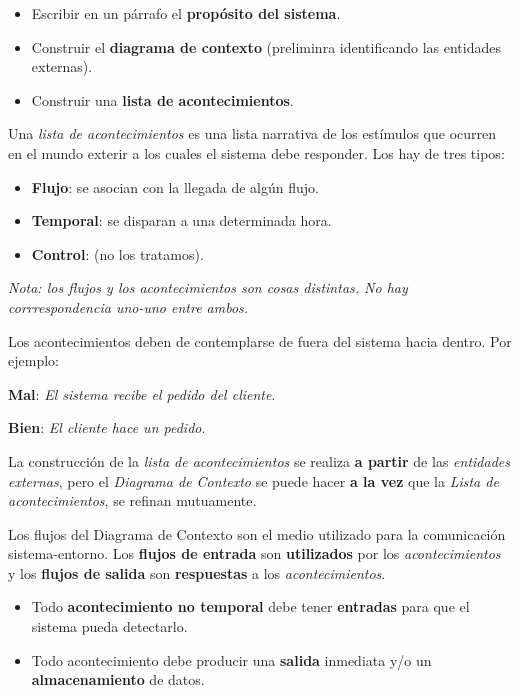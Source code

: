 \begin{itemize}[noitemsep]
\item Escribir en un párrafo el \textbf{propósito del sistema}.
\item Construir el \textbf{diagrama de contexto} (preliminra identificando las entidades externas).
\item Construir una \textbf{lista de acontecimientos}.
\end{itemize}

Una \textit{lista de acontecimientos} es una lista narrativa de los estímulos que ocurren en el mundo exterir a los cuales el sistema debe responder. Los hay de tres tipos:

\begin{itemize}[noitemsep]
\item \textbf{Flujo}: se asocian con la llegada de algún flujo.
\item \textbf{Temporal}: se disparan a una determinada hora.
\item \textbf{Control}: (no los tratamos).
\end{itemize}

\textit{Nota: los flujos y los acontecimientos son cosas distintas. No hay corrrespondencia uno-uno entre ambos.}

Los acontecimientos deben de contemplarse de fuera del sistema hacia dentro. Por ejemplo:

\textbf{Mal}: \textit{El sistema recibe el pedido del cliente}.

\textbf{Bien}: \textit{El cliente hace un pedido}.

La construcción de la \textit{lista de acontecimientos} se realiza \textbf{a partir} de las \textit{entidades externas}, pero el \textit{Diagrama de Contexto} se puede hacer \textbf{a la vez} que la \textit{Lista de acontecimientos}, se refinan mutuamente.

Los flujos del Diagrama de Contexto son el medio utilizado para la comunicación sistema-entorno. Los \textbf{flujos de entrada} son \textbf{utilizados} por los \textit{acontecimientos} y los \textbf{flujos de salida} son \textbf{respuestas} a los \textit{acontecimientos}.

\begin{itemize}[noitemsep]
\item Todo \textbf{acontecimiento no temporal} debe tener \textbf{entradas} para que el sistema pueda detectarlo.
\item Todo acontecimiento debe producir una \textbf{salida} inmediata y/o un \textbf{almacenamiento} de datos.
\end{itemize}


